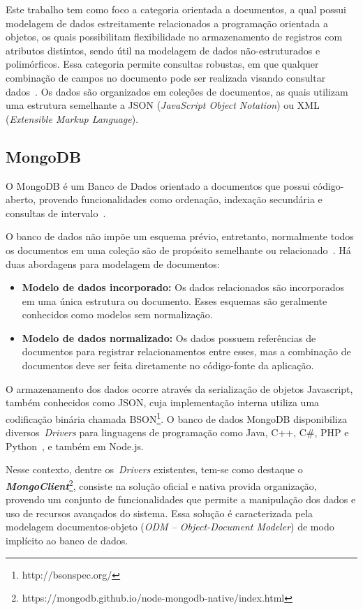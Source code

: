 \documentclass[12pt]{article}
\begin{document}
Este trabalho tem como foco a categoria orientada a documentos, a qual possui modelagem de dados estreitamente relacionados a programação orientada a objetos, os quais possibilitam flexibilidade no armazenamento de registros  com atributos distintos, sendo útil na modelagem de dados não-estruturados e polimórficos. Essa categoria permite consultas robustas, em que qualquer combinação de campos no documento pode ser realizada visando consultar dados~\cite{patil:2017}. Os dados são organizados em coleções de documentos, as quais utilizam uma estrutura semelhante a JSON (\emph{JavaScript Object Notation}) ou XML (\emph{Extensible Markup Language}).

\subsection{MongoDB}

O MongoDB é um Banco de Dados orientado a documentos que possui código-aberto, provendo funcionalidades como ordenação, indexação secundária e consultas de intervalo~\cite{membrey2011definitive}.
 
O banco de dados não impõe um esquema prévio, entretanto, normalmente todos os documentos em uma coleção são de propósito semelhante ou relacionado~\cite{kanade2014study,lutu2015big}. Há duas abordagens para modelagem de documentos:

\begin{itemize}
\item \textbf{Modelo de dados incorporado:} Os dados relacionados são incorporados em uma única estrutura ou documento. Esses esquemas são geralmente conhecidos como modelos sem normalização. %
\item \textbf{Modelo de dados normalizado:} Os dados possuem referências de documentos para registrar relacionamentos entre esses, mas a combinação de documentos deve ser feita diretamente no código-fonte da aplicação. %
\end{itemize}

O armazenamento dos dados ocorre através da serialização de objetos Javascript, também conhecidos como JSON, cuja implementação interna utiliza uma codificação binária chamada BSON\footnote{http://bsonspec.org/}. O banco de dados MongoDB disponibiliza diversos~\emph{Drivers} para linguagens de programação como Java, C++, C\#, PHP e Python~\cite{lutu2015big}, e também em Node.js.

Nesse contexto, dentre os~\emph{Drivers} existentes, tem-se como destaque o \textbf{\textit{MongoClient}}\footnote{https://mongodb.github.io/node-mongodb-native/index.html}, consiste na solução oficial e nativa provida organização, provendo um conjunto de funcionalidades que permite a manipulação dos dados e uso de recursos avançados do sistema. Essa solução é caracterizada pela modelagem documentos-objeto (\emph{ODM -- Object-Document Modeler}) de modo implícito ao banco de dados.
\end{document}

